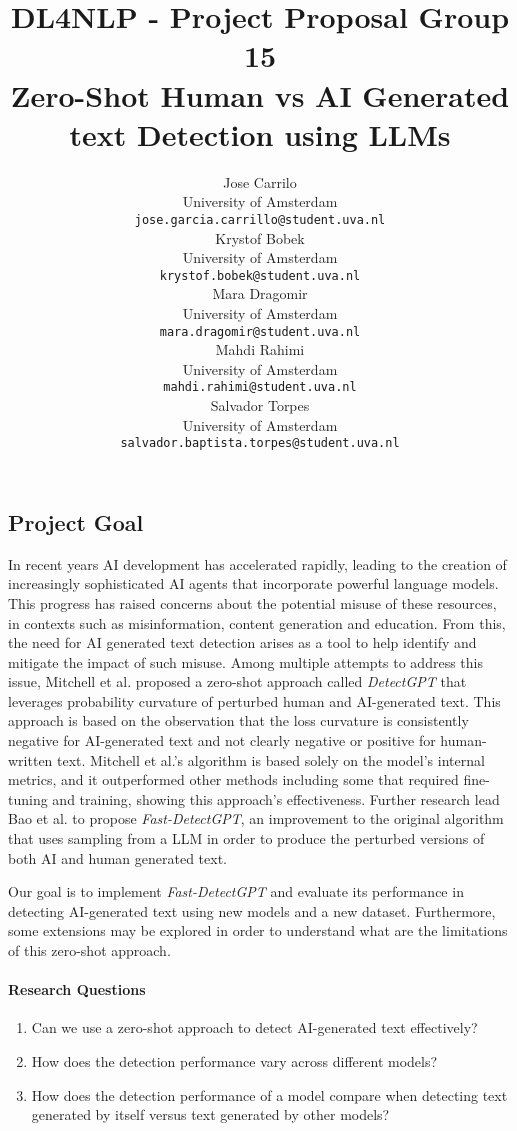 \documentclass{article}
\title{DL4NLP - Project Proposal Group 15 \\ Zero-Shot Human vs AI Generated text Detection using LLMs}
\author{%
    Jose Carrilo \\
    University of Amsterdam\\
    \texttt{jose.garcia.carrillo@student.uva.nl} \\
    \And
    Krystof Bobek \\
    University of Amsterdam\\
    \texttt{krystof.bobek@student.uva.nl} \\
    \And
    Mara Dragomir \\
    University of Amsterdam\\
    \texttt{mara.dragomir@student.uva.nl} \\
    \And
    Mahdi Rahimi \\
    University of Amsterdam\\
    \texttt{mahdi.rahimi@student.uva.nl} \\
    \And
    Salvador Torpes \\
    University of Amsterdam\\
    \texttt{salvador.baptista.torpes@student.uva.nl} \\
}
\begin{document}
\maketitle



\subsection*{Project Goal}

In recent years AI development has accelerated rapidly, leading to the creation of increasingly sophisticated AI agents that incorporate powerful language models. This progress has raised concerns about the potential misuse of these resources, in contexts such as misinformation, content generation and education. From this, the need for AI generated text detection arises as a tool to help identify and mitigate the impact of such misuse. Among multiple attempts to address this issue, Mitchell et al.\cite{detectgpt} proposed a zero-shot approach called \textit{DetectGPT} that leverages probability curvature of perturbed human and AI-generated text. This approach is based on the observation that the loss curvature is consistently negative for AI-generated text and not clearly negative or positive for human-written text. Mitchell et al.'s \cite{detectgpt} algorithm is based solely on the model's internal metrics, and it outperformed other methods including some that required fine-tuning and training, showing this approach's effectiveness. Further research lead Bao et al.\cite{fastdetectgpt} to propose \textit{Fast-DetectGPT}, an improvement to the original algorithm that uses sampling from a LLM in order to produce the perturbed versions of both AI and human generated text.

Our goal is to implement \textit{Fast-DetectGPT} and evaluate its performance in detecting AI-generated text using new models and a new dataset. Furthermore, some extensions may be explored in order to understand what are the limitations of this zero-shot approach. 

\paragraph{Research Questions}

\begin{enumerate}
  \item Can we use a zero-shot approach to detect AI-generated text effectively?
  \item How does the detection performance vary across different models?
  \item How does the detection performance of a model compare when detecting text generated by itself versus text generated by other models?
\end{enumerate}
\end{document}
